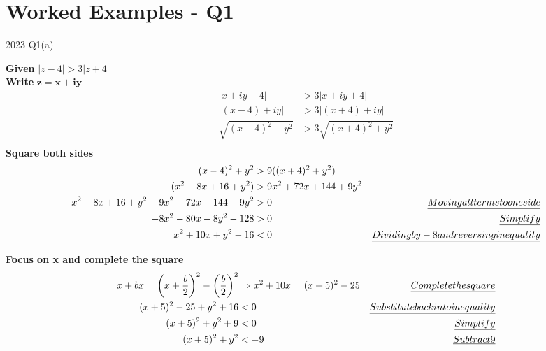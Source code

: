 \documentclass[a4paper, 8pt]{extarticle}
\begin{document}
\pagebreak

\section{Worked Examples - Q1}

\begin{examplebox}{2023 Q1(a)}{}
	\label{sol:2023Q1a}

	\textbf{Given} $|z - 4| > 3|z+4|$ \\
	\textbf{Write} $\boldsymbol{z = x + iy}$
	\begin{align*}
		| x + iy -4|         & > 3 |x + iy + 4|         \\
		| (x - 4) + iy|      & > 3 |(x + 4) + iy|       \\
		\sqrt{(x-4)^2 + y^2} & > 3 \sqrt{(x+4)^2 + y^2} \\
	\end{align*}
	\textbf{Square both sides}
	\begin{align*}
		(x-4)^2 + y^2                                 & > 9((x+4)^2 + y^2)                                                         \\
		(x^2 - 8x + 16 + y^2)                         & > 9x^2 + 72x + 144 + 9y^2                                                  \\
		x^2 - 8x + 16 + y^2 - 9x^2 - 72x - 144 - 9y^2 & > 0                       & \emph{Moving all terms to one side}            \\
		-8x^2 - 80x - 8y^2 - 128                      & > 0                       & \emph{Simplify }                               \\
		x^2 + 10x + y^2 - 16                          & < 0                       & \emph{Dividing by -8 and reversing inequality} \\
	\end{align*}

	\textbf{Focus on x and complete the square}
	\begin{align*}
		x + bx                   = \left(x + \frac{b}{2}\right)^2 - \left(\frac{b}{2}\right)^2 & \Rightarrow  x^2 + 10x = (x + 5)^2 - 25 & \emph{Complete the square}             \\
		(x+5)^2 - 25 + y^2 + 16                                                                & < 0                                     & \emph{Substitute back into inequality} \\
		(x+5)^2 + y^2 + 9                                                                      & < 0                                     & \emph{Simplify}                        \\
		(x+5)^2 + y^2                                                                          & < -9                                    & \emph{Subtract 9}                      \\
	\end{align*}


\end{examplebox}
\end{document}
